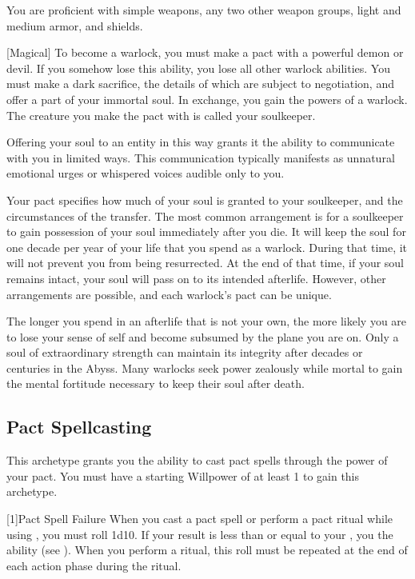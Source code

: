         You are proficient with simple weapons, any two other weapon groups, light and medium armor, and shields.

        [Magical]
        To become a warlock, you must make a pact with a powerful demon or devil.
        If you somehow lose this ability, you lose all other warlock abilities.
        You must make a dark sacrifice, the details of which are subject to negotiation, and offer a part of your immortal soul.
        In exchange, you gain the powers of a warlock.
        The creature you make the pact with is called your soulkeeper.

        Offering your soul to an entity in this way grants it the ability to communicate with you in limited ways.
        This communication typically manifests as unnatural emotional urges or whispered voices audible only to you.

        Your pact specifies how much of your soul is granted to your soulkeeper, and the circumstances of the transfer.
        The most common arrangement is for a soulkeeper to gain possession of your soul immediately after you die.
        It will keep the soul for one decade per year of your life that you spend as a warlock.
        During that time, it will not prevent you from being resurrected.
        At the end of that time, if your soul remains intact, your soul will pass on to its intended afterlife.
        However, other arrangements are possible, and each warlock's pact can be unique.

        The longer you spend in an afterlife that is not your own, the more likely you are to lose your sense of self and become subsumed by the plane you are on.
        Only a soul of extraordinary strength can maintain its integrity after decades or centuries in the Abyss.
        Many warlocks seek power zealously while mortal to gain the mental fortitude necessary to keep their soul after death.

    \subsection{Pact Spellcasting}
        This archetype grants you the ability to cast pact spells through the power of your pact.
        You must have a starting Willpower of at least 1 to gain this archetype.

        [1]{Pact Spell Failure}
        When you cast a pact spell or perform a pact ritual while using , you must roll 1d10.
        If your result is less than or equal to your , you  the ability (see ).
        When you perform a ritual, this roll must be repeated at the end of each action phase during the ritual.

